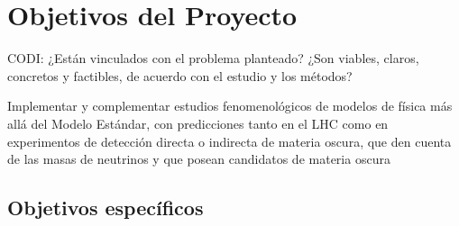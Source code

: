 \section{Objetivos del Proyecto }
\begin{instrucciones}
 CODI: ¿Están vinculados con el problema planteado? ¿Son viables, claros, concretos y factibles, de acuerdo con el estudio y los métodos?
\end{instrucciones}

Implementar y complementar estudios fenomenológicos de modelos de
física más allá del Modelo Estándar, con predicciones tanto en el LHC
como en experimentos de detección directa o indirecta de materia
oscura, que den cuenta de las masas de neutrinos y que posean
candidatos de materia oscura

\subsection{Objetivos específicos}

